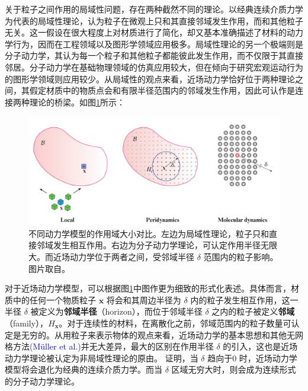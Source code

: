 关于粒子之间作用的局域性问题，存在两种截然不同的理论。以经典连续介质力学为代表的局域性理论，认为粒子在微观上只和其直接邻域发生作用，而和其他粒子无关。这一假设在很大程度上对材质进行了简化，却又基本准确描述了材料的动力学行为，因而在工程领域以及图形学领域应用极多。局域性理论的另一个极端则是分子动力学，其认为每一个粒子和其他粒子都能彼此发生作用，而不仅限于其直接邻居。分子动力学在基础物理领域的仿真应用较大，但在倾向于研究宏观运动行为的图形学领域则应用较少。从局域性的观点来看，近场动力学恰好位于两种理论之间，其假定材质中的物质点会和有限半径范围内的邻域发生作用，因此可认作是连接两种理论的桥梁。如图\ref{peridynamics_comparison}所示：

\begin{figure}[htbp!]
  \centering
  \captionsetup{justification=centering}
  \includegraphics[width=\linewidth]{chap/image/peridynamics_comparison}

  \caption{\label{peridynamics_comparison}
           不同动力学模型的作用域大小对比。左边为局域性理论，粒子只和直接邻域发生相互作用。右边为分子动力学理论，可认定作用半径无限大。而近场动力学位于两者之间，受邻域半径 $\delta$ 范围内的粒子影响。图片取自。
          }
\end{figure}

对于近场动力学模型，可以根据图\ref{peridynamics_comparison}中图作更为细致的形式化表述。具体而言，材质中的任何一个物质粒子 $\mathbf{x}$ 将会和其周边半径为 $\delta$ 内的粒子发生相互作用，这一半径 $\delta$ 被定义为\textbf{邻域半径}（horizon），而位于邻域半径 $\delta$ 之内的粒子被定义\textbf{邻域}（family），$H_\mathbf{x}$。对于连续性的材料，在离散化之前，邻域范围内的粒子数量可认定是无穷的。从用粒子来表示物体的观点来看，近场动力学的基本思想和其他无网格方法\textcolor{blue}{(M\"{u}ller et al.)\parencite{Muller2003}\parencite{Muller2003}}并无大差异，最大的区别在作用半径 $\delta$ 的引入，这也是近场动力学理论被认定为非局域性理论的原由。 证明，当 $\delta$ 趋向于0 时，近场动力学模型将会退化为经典的连续介质力学。而当 $\delta$ 区域无穷大时，则会成为连续形式的分子动力学理论。

